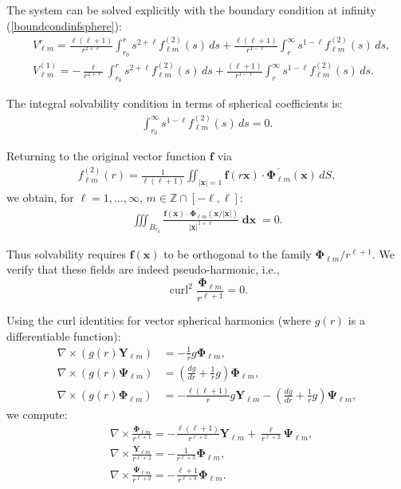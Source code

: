 \documentclass[a4paper]{article}
\newcommand{\Z}{\mathbb{Z}}
\newcommand{\bx}{\mathbf{x}}
\newcommand{\bff}{\mathbf{f}}
\newcommand{\dx}{\operatorname{\mathbf{dx}}}
\newcommand{\curl}{\operatorname{curl}}
\begin{document}
The system can be solved explicitly with the boundary condition at infinity (\ref{boundcondinfsphere}):
\begin{align}
&V_{\ell m}^{r} = \frac{\ell (\ell +1)}{r^{2+\ell}}\int_{r_0}^r
s^{2+\ell}  f_{\ell m}^{(2)}(s)\,ds +
\frac{\ell (\ell +1)}{r^{1-\ell}}\int_{r}^\infty
s^{1-\ell}  f_{\ell m}^{(2)}(s)\,ds,  \label{sol_sphere_1}\\
&V_{\ell m}^{(1)} = - \frac{\ell}{r^{2+\ell}}\int_{r_0}^r
s^{2+\ell}  f_{\ell m}^{(2)}(s)\,ds +
\frac{(\ell +1)}{r^{1-\ell}}\int_{r}^\infty
s^{1-\ell}  f_{\ell m}^{(2)}(s)\,ds. \label{sol_sphere_2}
\end{align}

The integral solvability condition in terms of spherical coefficients is:
\begin{align}\label{ortcondspherepolar}
\int_{r_0}^\infty
s^{1-\ell}  f_{\ell m}^{(2)}(s)\,ds = 0.
\end{align}

Returning to the original vector function $\bff$ via
\begin{align*}
f_{\ell m}^{(2)}(r) = \frac1{\ell (\ell +1)} \iint_{|\bx|=1} \bff(r\bx) \cdot \overline{\mathbf {\Phi}_{\ell m}}(\bx)\,dS,
\end{align*}
we obtain, for $\ell=1,\ldots,\infty$, $m\in\Z \cap [-\ell,\ell]$:
\begin{align}\label{ortcondsphere}
\iiint_{B_{r_0}} \frac{\bff(\bx) \cdot \overline{\mathbf {\Phi}_{\ell m}}\left (\bx/|\bx| \right )}
{|\bx|^{1 + \ell}} \dx =0.
\end{align}

Thus solvability requires $\bff(\bx)$ to be orthogonal to the family $\mathbf{\Phi}_{\ell m}/r^{\ell+1}$. We verify that these fields are indeed pseudo-harmonic, i.e.,
$$\curl^2 \frac{\mathbf \Phi_{\ell m}}{r^{\ell+1}} =0.$$

Using the curl identities for vector spherical harmonics (where $g(r)$ is a differentiable function):
\begin{align*}
\nabla \times \left(g(r)\mathbf {Y} _{\ell m}\right)&=-{\frac {1}{r}}g \mathbf {\Phi } _{\ell m},\\
\nabla \times \left(g(r) \mathbf {\Psi } _{\ell m}\right)&=\left({\frac {dg}{dr}}+{\frac {1}{r}}g\right)\mathbf {\Phi } _{\ell m},\\
\nabla \times \left(g(r)\mathbf {\Phi } _{\ell m}\right)&=-{\frac {\ell (\ell +1)}{r}}g\mathbf {Y} _{\ell m}-\left({\frac {dg}{dr}}+{\frac {1}{r}}g\right)\mathbf {\Psi } _{\ell m},
\end{align*}
we compute:
\begin{align*}
&\nabla \times \frac{\mathbf \Phi_{\ell m}}{r^{\ell+1}} = - \frac{\ell(\ell+1)}{r^{\ell+2}}\mathbf Y_{\ell m} + \frac \ell{r^{\ell+2}} \mathbf \Psi_{\ell m},\\
&\nabla \times \frac{\mathbf Y_{\ell m}}{r^{\ell+2}} = -\frac 1{r^{\ell+3}} \mathbf \Phi_{\ell m},\\
&\nabla \times \frac{\mathbf \Psi_{\ell m}}{r^{\ell+2}} =
-\frac {\ell+1}{r^{\ell+3}} \mathbf \Phi_{\ell m}.
\end{align*}
\end{document}
